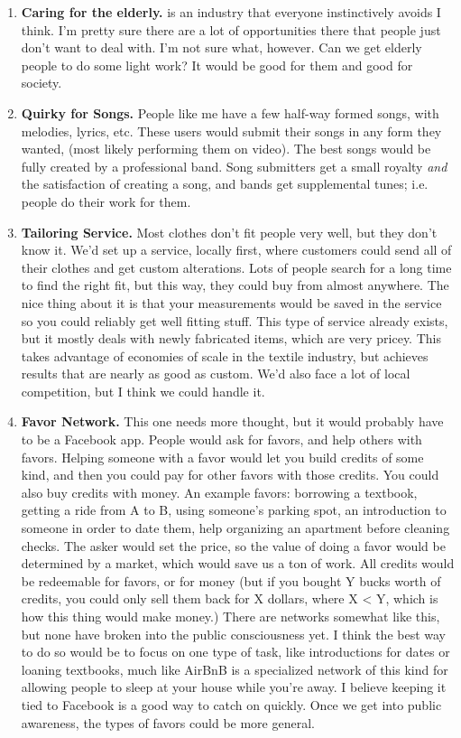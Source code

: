 \documentclass[paper=a4, fontsize=11pt]{scrartcl} %
\numberwithin{equation}{section} %
\numberwithin{figure}{section} %
\numberwithin{table}{section} %
\begin{document}
\begin{enumerate}
\item \textbf{Caring for the elderly.} is an industry that everyone instinctively avoids I think.  I'm pretty sure there are a lot of opportunities there that people just don't want to deal with.  I'm not sure what, however.  Can we get elderly people to do some light work?  It would be good for them and good for society.

\item \textbf{Quirky for Songs.}  People like me have a few half-way formed songs, with melodies, lyrics, etc.  These users would submit their songs in any form they wanted, (most likely performing them on video).  The best songs would be fully created by a professional band.  Song submitters get a small royalty \textit{and} the satisfaction of creating a song, and bands get supplemental tunes; i.e. people do their work for them.

\item \textbf{Tailoring Service.}  Most clothes don't fit people very well, but they don't know it.  We'd set up a service, locally first, where customers could send all of their clothes and get custom alterations.  Lots of people search for a long time to find the right fit, but this way, they could buy from almost anywhere.  The nice thing about it is that your measurements would be saved in the service so you could reliably get well fitting stuff.  This type of service already exists, but it mostly deals with newly fabricated items, which are very pricey.  This takes advantage of economies of scale in the textile industry, but achieves results that are nearly as good as custom.  We'd also face a lot of local competition, but I think we could handle it.

\item \textbf{Favor Network.}  This one needs more thought, but it would probably have to be a Facebook app.  People would ask for favors, and help others with favors.  Helping someone with a favor would let you build credits of some kind, and then you could pay for other favors with those credits.  You could also buy credits with money.  An example favors: borrowing a textbook, getting a ride from A to B, using someone's parking spot, an introduction to someone in order to date them, help organizing an apartment before cleaning checks.  The asker would set the price, so the value of doing a favor would be determined by a market, which would save us a ton of work.  All credits would be redeemable for favors, or for money (but if you bought Y bucks worth of credits, you could only sell them back for X dollars, where X < Y, which is how this thing would make money.)  There are networks somewhat like this, but none have broken into the public consciousness yet.  I think the best way to do so would be to focus on one type of task, like introductions for dates or loaning textbooks, much like AirBnB is a specialized network of this kind for allowing people to sleep at your house while you're away.  I believe keeping it tied to Facebook is a good way to catch on quickly.  Once we get into public awareness, the types of favors could be more general.  



\end{enumerate}
\end{document}
